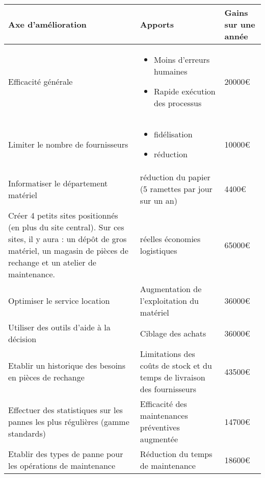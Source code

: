     \begin{tabular}{|p{7cm}|p{5cm}|p{2cm}|}    \hline
Axe d'amélioration & Apports & Gains sur une année\\ \hline

Efficacité générale
                                  & \begin{itemize}
                                      \item Moins d'erreurs humaines
                                      \item Rapide exécution des processus
                                     \end{itemize}
                                                          & 20000€  \\ \cline{1-2}
Limiter le nombre de fournisseurs 
                                  & \begin{itemize}
                                      \item fidélisation
                                      \item réduction
                                     \end{itemize}
                                                          & 10000€  \\ \cline{1-2}
Informatiser le département matériel 
                                  & réduction du papier (5 ramettes par jour sur un an)
                                                          & 4400€  \\ \cline{1-2}
Créer 4 petits sites positionnés (en plus du site central). Sur ces sites, il y aura : un dépôt de gros matériel, un magasin de
pièces de rechange et un atelier de maintenance. 
                                  & réelles économies logistiques
                                                          & 65000€  \\ \cline{1-2}
Optimiser le service location 
                                  & Augmentation de l'exploitation du matériel
                                                          &  36000€ \\ \cline{1-2}  
Utiliser des outils d'aide à la décision
                                  & Ciblage des achats
                                                          &  36000€ \\ \cline{1-2} 
Etablir un historique des besoins en pièces de rechange
                                  & Limitations des coûts de stock et du temps de livraison des fournisseurs
                                                          &  43500€ \\ \cline{1-2} 
Effectuer des statistiques sur les pannes les plus régulières (gamme standards)
                                  & Efficacité des maintenances préventives augmentée
                                                          &   14700€\\ \cline{1-2}         
Etablir des types de panne pour les opérations de maintenance
                                  & Réduction du temps de maintenance
                                                          &   18600€\\ \cline{1-2}


\end{tabular}
